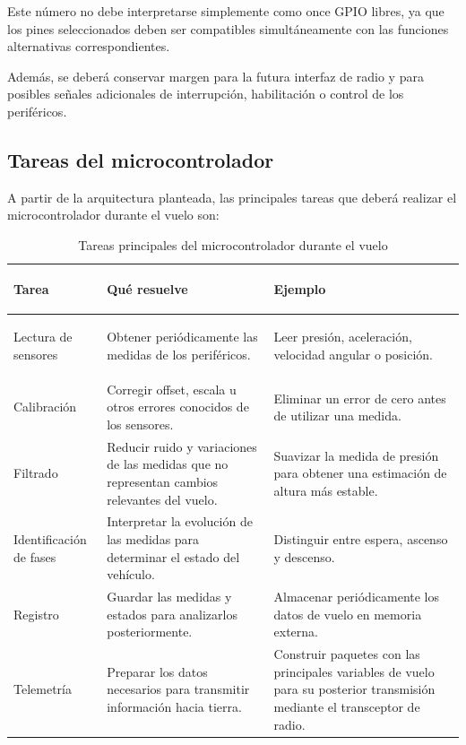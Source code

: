 \documentclass[11pt,a4paper]{article}
\begin{document}
Este número no debe interpretarse simplemente como once GPIO libres,
ya que los pines seleccionados deben ser compatibles simultáneamente con
las funciones alternativas correspondientes.

Además, se deberá conservar margen para la futura interfaz de radio y
para posibles señales adicionales de interrupción, habilitación o
control de los periféricos.

\newpage
\subsection{Tareas del microcontrolador}

A partir de la arquitectura planteada, las principales tareas que deberá
realizar el microcontrolador durante el vuelo son:

\begin{table}[H]

\centering
\small
\renewcommand{\arraystretch}{1.3}

\begin{tabularx}{\textwidth}{
    >{\bfseries\raggedright\arraybackslash}p{3.0cm}
    >{\raggedright\arraybackslash}X
    >{\raggedright\arraybackslash}X
}

\toprule
Tarea & Qué resuelve & Ejemplo \\
\midrule

Lectura de sensores &
Obtener periódicamente las medidas de los periféricos. &
Leer presión, aceleración, velocidad angular o posición. \\

Calibración &
Corregir offset, escala u otros errores conocidos de los sensores. &
Eliminar un error de cero antes de utilizar una medida. \\

Filtrado &
Reducir ruido y variaciones de las medidas que no representan cambios
relevantes del vuelo. &
Suavizar la medida de presión para obtener una estimación de altura más estable. \\

Identificación de fases &
Interpretar la evolución de las medidas para determinar el estado del vehículo. &
Distinguir entre espera, ascenso y descenso. \\

Registro &
Guardar las medidas y estados para analizarlos posteriormente. &
Almacenar periódicamente los datos de vuelo en memoria externa. \\

Telemetría &
Preparar los datos necesarios para transmitir información hacia tierra. &
Construir paquetes con las principales variables de vuelo para su posterior
transmisión mediante el transceptor de radio. \\

\bottomrule

\end{tabularx}

\caption{Tareas principales del microcontrolador durante el vuelo}%
\label{tab:tareas_microcontrolador}

\end{table}
\end{document}
